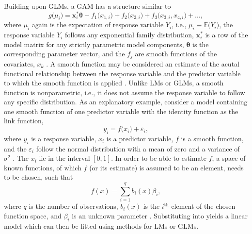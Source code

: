 Building upon GLMs, a GAM has a structure similar to
\begin{equation}
  \label{eq:GAM}
  g\bigl(\mu_i\bigr) = \symbf{x}_i^* \symbf{\theta} + f_{1}\bigl(x_{1, i}\bigr) + f_{2}\bigl(x_{2, i}\bigr) + f_{3}\bigl(x_{3, i}, x_{4, i}\bigr) + \ldots,
\end{equation}
where \(\mu_i\) again is the expectation of response variable \(Y_i\), i.e., \(\mu_i \equiv \mathbb{E}\bigl(Y_i\bigr)\), the response variable \(Y_i\) follows any exponential family distribution, \(\symbf{x}_i^*\) is a row of the model matrix for any strictly parametric model components, \(\symbf{\theta}\) is the corresponding parameter vector, and the \(f_j\) are smooth functions of the covariates, \(x_k\) \parencite{Wood2006}.  A smooth function may be considered an estimate of the acutal functional relationship between the response variable and the predictor variable to which the smooth function is applied \parencite{Hastie1991}.  Unlike LMs or GLMs, a smooth function is nonparametric, i.e., it does not assume the response variable to follow any specific distribution.
As an explanatory example, consider a model containing one smooth function of one predictor variable with the identity function as the link function,
\begin{equation}
  \label{eq:GAMSimple}
  y_i = f\bigl(x_i\bigr) + \varepsilon_i,
\end{equation}
where \(y_i\) is a response variable, \(x_i\) is a predictor variable, \(f\) is a smooth function, and the \(\varepsilon_i\) follow the normal distribution with a mean of zero and a variance of \(\sigma^2\) \parencite{Wood2006}.  The \(x_i\) lie in the interval \([0, 1]\).  In order to be able to estimate \(f\), a space of known functions, of which \(f\) (or its estimate) is assumed to be an element, needs to be chosen, such that
\begin{equation}
  \label{eq:SmoothFunctionBasis}
  f(x) = \sum_{i = 1}^q b_i(x)\beta_i,
\end{equation}
where \(q\) is the number of observations, \(b_i(x)\) is the \(i^{\text{th}}\) element of the chosen function space, and \(\beta_i\) is an unknown parameter \parencite{Wood2006}.  Substituting  into  yields a linear model which can then be fitted using methods for LMs or GLMs.


